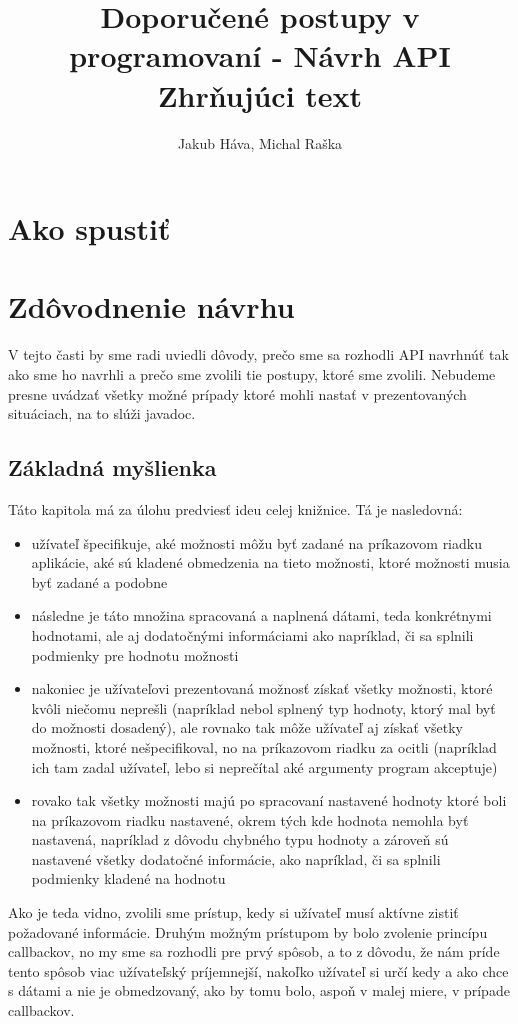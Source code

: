 \documentclass{article}
\title{\vspace{30mm}Doporučené postupy v programovaní - Návrh API\\Zhrňujúci text}
\author{Jakub Háva, Michal Raška}
\date{}
\begin{document}
\maketitle
\thispagestyle{empty}

\clearpage
\tableofcontents

\clearpage
\section{Ako spustiť}

\section{Zdôvodnenie návrhu}
V tejto časti by sme radi uviedli dôvody, prečo sme sa rozhodli API navrhnúť tak ako sme ho navrhli a prečo sme zvolili tie postupy, ktoré sme zvolili. Nebudeme presne uvádzať všetky možné prípady ktoré mohli nastať v prezentovaných situáciach, na to slúži javadoc.

\subsection{Základná myšlienka}
Táto kapitola má za úlohu predviesť ideu celej knižnice. Tá je nasledovná:
\begin{itemize}
	\item užívateľ špecifikuje, aké možnosti môžu byť zadané na príkazovom riadku aplikácie, aké sú kladené obmedzenia na tieto možnosti, ktoré možnosti musia byť zadané a podobne
	\item následne je táto množina spracovaná a naplnená dátami, teda konkrétnymi hodnotami, ale aj dodatočnými informáciami ako napríklad, či sa splnili podmienky pre hodnotu možnosti
	\item nakoniec je užívateľovi prezentovaná možnosť získať všetky možnosti, ktoré kvôli niečomu neprešli (napríklad nebol splnený typ hodnoty, ktorý mal byť do možnosti dosadený), ale rovnako tak môže užívateľ aj získať všetky možnosti, ktoré nešpecifikoval, no na príkazovom riadku za ocitli (napríklad ich tam zadal užívateľ, lebo si neprečítal aké argumenty program akceptuje)
	\item rovako tak všetky možnosti majú po spracovaní nastavené hodnoty ktoré boli na príkazovom riadku nastavené, okrem tých kde hodnota nemohla byť nastavená, napríklad z dôvodu chybného typu hodnoty a zároveň sú nastavené všetky dodatočné informácie, ako napríklad, či sa splnili podmienky kladené na hodnotu
\end{itemize}
Ako je teda vidno, zvolili sme prístup, kedy si užívateľ musí aktívne zistiť požadované informácie. Druhým možným prístupom by bolo zvolenie princípu callbackov, no my sme sa rozhodli pre prvý spôsob, a to z dôvodu, že nám príde tento spôsob viac užívateľský príjemnejší, nakoľko užívateľ si určí kedy a ako chce s dátami a nie je obmedzovaný, ako by tomu bolo, aspoň v malej miere, v prípade callbackov.
\end{document}

